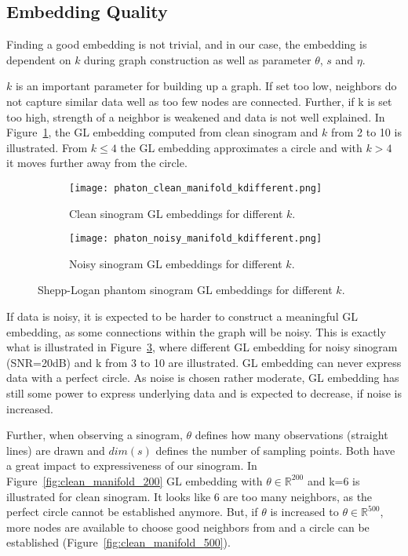 \subsection{Embedding Quality}
\label{sec:embedding_quality}

Finding a good embedding is not trivial, and in our case, the embedding is dependent on $k$ during graph construction
as well as parameter $\theta$, $s$ and $\eta$.

$k$ is an important parameter for building up a graph. If set too low, neighbors
do not capture similar data well as too few nodes are connected. 
Further, if k is set too high, strength of a neighbor 
is weakened and data is not well explained.
In Figure~\ref{fig:clean_manifolds}, the GL embedding computed from clean sinogram and $k$ from 2 to 10 is illustrated.
From $k \leq 4$ the GL embedding approximates a circle and with $k >  4$ it moves further away from the circle. 


\begin{figure}[H]
    \captionsetup[subfigure]{justification=centering}
    \centering
    \begin{subfigure}[t]{0.45\textwidth}
        \texttt{[image: phaton\_clean\_manifold\_kdifferent.png]}
        \caption{Clean sinogram GL embeddings for different $k$.}
        \label{fig:clean_manifolds}
    \end{subfigure}\hfill
    \begin{subfigure}[t]{0.45\textwidth}
      \texttt{[image: phaton\_noisy\_manifold\_kdifferent.png]}
      \caption{Noisy sinogram GL embeddings for different $k$.}
      \label{fig:noisy_manifolds}
    \end{subfigure}\hfill
    \caption{Shepp-Logan phantom sinogram GL embeddings for different $k$.}
  \end{figure}

If data is noisy, it is expected to be harder to construct a meaningful GL embedding, as some connections within
the graph will be noisy. This is exactly what is illustrated in Figure~\ref{fig:noisy_manifolds}, where 
different GL embedding for noisy sinogram (SNR=20dB) and k from 3 to 10 are illustrated.
GL embedding can never express data with a perfect circle. As noise is chosen rather moderate, GL embedding has still some 
power to express underlying data and is expected to decrease, if noise is increased.


Further, when observing a sinogram, $\theta$ defines how many observations (straight lines) are drawn
and $dim(s)$ defines the number of sampling points. Both have a great impact to expressiveness of our sinogram.
In Figure~\ref{fig:clean_manifold_200} GL embedding with $\theta \in \mathbb{R}^{200}$ and k=6 is illustrated
for clean sinogram. It looks like 6 are too many neighbors, as the perfect circle cannot be established anymore.
But, if $\theta$ is increased to $\theta \in \mathbb{R}^{500}$, more nodes are available to choose good neighbors from
and a circle can be established (Figure~\ref{fig:clean_manifold_500}).

